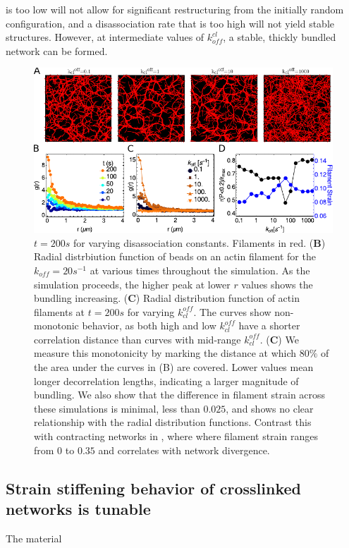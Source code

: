 \documentclass[12pt]{article} \usepackage{times} \usepackage{graphicx}
\begin{document}
is too low will not allow for significant restructuring from the initially
random configuration, and a disassociation rate that is too high will not yield
stable structures. However, at intermediate values of $k_{off}^{cl}$, a stable,
thickly bundled network can be formed.  \par \begin{figure}[H] \centering
  \includegraphics[scale=1.2]{figs/bundling/full_figure.pdf} \caption{%
    \label{fig:bundle}%
    $t=200s$ for varying disassociation constants. Filaments in red.
    (\textbf{B}) Radial distrbiution function of beads on an actin filament for
    the $k_{off}=20 s^{-1}$ at various times throughout the simulation. As the
    simulation proceeds, the higher peak at lower $r$ values shows the bundling
    increasing.  (\textbf{C}) Radial distribution function of actin filaments
    at $t=200s$ for varying $k_{cl}^{off}$.  The curves show non-monotonic
    behavior, as both high and low $k_{cl}^{off}$ have a shorter correlation
    distance than curves with mid-range $k_{cl}^{off}$.  (\textbf{C}) We
    measure this monotonicity by marking the distance at which $80\%$ of the
    area under the curves in (B) are covered. Lower values mean longer
    decorrelation lengths, indicating a larger magnitude of bundling. We also
    show that the difference in filament strain across these simulations is
    minimal, less than $0.025$, and shows no clear relationship with the radial
    distribution functions. Contrast this with contracting networks in
    , where where filament strain ranges from $0$ to $0.35$
    and correlates with network divergence.  } \end{figure} \subsection{Strain
  stiffening behavior of crosslinked networks is tunable} \par The material
\end{document}
